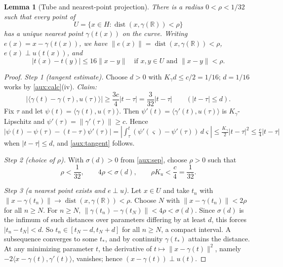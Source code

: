 \documentclass[11pt]{article}
\newcommand{\R}{\mathbb R}
\newcommand{\norm}[1]{\lVert #1\rVert}
\newcommand{\ip}[2]{\langle #1,#2\rangle}
\DeclareMathOperator{\dist}{dist}
\newtheorem{lemma}[theorem]{Lemma}
\theoremstyle{definition}
\numberwithin{equation}{section}
\begin{document}
\begin{lemma}[Tube and nearest-point projection]\label{aux:tube}
There is a radius \(0<\rho<1/32\) such that every point of
\[
 U=\{x\in H:\dist(x,\gamma(\R))<\rho\}
\]
has a unique nearest point \(\gamma(t(x))\) on the curve. Writing
\(e(x)=x-\gamma(t(x))\), we have \(\norm{e(x)}=\dist(x,\gamma(\R))<\rho\),
\(e(x)\perp u(t(x))\), and
\begin{equation}\label{aux:parameter}
 |t(x)-t(y)|\le16\norm{x-y}
 \quad\text{if }x,y\in U\text{ and }\norm{x-y}<\rho.
\end{equation}
\end{lemma}

\begin{proof}
\emph{Step 1 (tangent estimate).} Choose \(d>0\) with
\(K_\gamma d\le c/2=1/16\); \(d=1/16\) works by \cref{aux:calc}(iv).
\emph{Claim:}
\begin{equation}\label{aux:tangent}
 |\ip{\gamma(t)-\gamma(\tau)}{u(\tau)}|
 \ge\frac{3c}{4}|t-\tau|=\frac{3}{32}|t-\tau|
 \qquad(|t-\tau|\le d).
\end{equation}
Fix \(\tau\) and let \(\psi(t)=\ip{\gamma(t)}{u(\tau)}\). Then
\(\psi'(t)=\ip{\gamma'(t)}{u(\tau)}\) is \(K_\gamma\)-Lipschitz and
\(\psi'(\tau)=\norm{\gamma'(\tau)}\ge c\). Hence
\(|\psi(t)-\psi(\tau)-(t-\tau)\psi'(\tau)|
=|\int_\tau^t(\psi'(\varsigma)-\psi'(\tau))\,d\varsigma|
\le\frac{K_\gamma}2|t-\tau|^2\le\frac c4|t-\tau|\) when \(|t-\tau|\le d\), and
\eqref{aux:tangent} follows.

\emph{Step 2 (choice of \(\rho\)).} With \(\sigma(d)>0\) from \cref{aux:sep},
choose \(\rho>0\) such that
\begin{equation}\label{aux:radius}
 \rho<\frac1{32},\qquad 4\rho<\sigma(d),\qquad \rho K_u<\frac c4=\frac1{32}.
\end{equation}

\emph{Step 3 (a nearest point exists and \(e\perp u\)).} Let \(x\in U\) and
take \(t_n\) with \(\norm{x-\gamma(t_n)}\to\dist(x,\gamma(\R))<\rho\). Choose
\(N\) with \(\norm{x-\gamma(t_n)}<2\rho\) for all \(n\ge N\). For \(n\ge N\),
\(\norm{\gamma(t_n)-\gamma(t_N)}<4\rho<\sigma(d)\). Since \(\sigma(d)\) is the
infimum of such distances over parameters differing by at least \(d\), this
forces \(|t_n-t_N|<d\). So \(t_n\in[t_N-d,t_N+d]\) for all \(n\ge N\), a
compact interval. A subsequence converges to some \(t_*\), and by continuity
\(\gamma(t_*)\) attains the distance. At any minimizing parameter \(t\), the
derivative of \(t\mapsto\norm{x-\gamma(t)}^2\), namely
\(-2\ip{x-\gamma(t)}{\gamma'(t)}\), vanishes; hence
\((x-\gamma(t))\perp u(t)\).


\end{proof}
\end{document}
